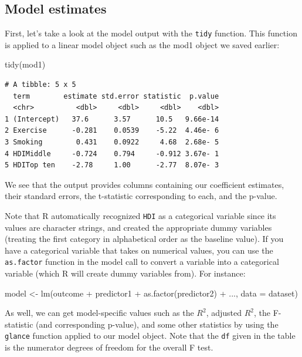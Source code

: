\documentclass[
  letterpaper,
  DIV=11,
  numbers=noendperiod]{scrartcl}
\newenvironment{Shaded}{\begin{snugshade}}{\end{snugshade}}
\newcommand{\AttributeTok}[1]{\textcolor[rgb]{0.40,0.45,0.13}{#1}}
\newcommand{\FunctionTok}[1]{\textcolor[rgb]{0.28,0.35,0.67}{#1}}
\newcommand{\NormalTok}[1]{\textcolor[rgb]{0.00,0.23,0.31}{#1}}
\newcommand{\OtherTok}[1]{\textcolor[rgb]{0.00,0.23,0.31}{#1}}
\newcommand{\SpecialCharTok}[1]{\textcolor[rgb]{0.37,0.37,0.37}{#1}}
\begin{document}
\subsection{Model estimates}\label{model-estimates}

First, let's take a look at the model output with the \texttt{tidy}
function. This function is applied to a linear model object such as the
mod1 object we saved earlier:

\begin{Shaded}
\begin{Highlighting}[]
\FunctionTok{tidy}\NormalTok{(mod1)}
\end{Highlighting}
\end{Shaded}

\begin{verbatim}
# A tibble: 5 x 5
  term        estimate std.error statistic  p.value
  <chr>          <dbl>     <dbl>     <dbl>    <dbl>
1 (Intercept)   37.6      3.57      10.5   9.66e-14
2 Exercise      -0.281    0.0539    -5.22  4.46e- 6
3 Smoking        0.431    0.0922     4.68  2.68e- 5
4 HDIMiddle     -0.724    0.794     -0.912 3.67e- 1
5 HDITop ten    -2.78     1.00      -2.77  8.07e- 3
\end{verbatim}

We see that the output provides columns containing our coefficient
estimates, their standard errors, the t-statistic corresponding to each,
and the p-value.

Note that R automatically recognized \texttt{HDI} as a categorical
variable since its values are character strings, and created the
appropriate dummy variables (treating the first category in alphabetical
order as the baseline value). If you have a categorical variable that
takes on numerical values, you can use the \texttt{as.factor} function
in the model call to convert a variable into a categorical variable
(which R will create dummy variables from). For instance:

\begin{Shaded}
\begin{Highlighting}[]
\NormalTok{model }\OtherTok{\textless{}{-}} \FunctionTok{lm}\NormalTok{(outcome }\SpecialCharTok{+}\NormalTok{ predictor1 }\SpecialCharTok{+} \FunctionTok{as.factor}\NormalTok{(predictor2) }\SpecialCharTok{+}\NormalTok{ ..., }\AttributeTok{data =}\NormalTok{ dataset)}
\end{Highlighting}
\end{Shaded}

As well, we can get model-specific values such as the \(R^2\), adjusted
\(R^2\), the F-statistic (and corresponding p-value), and some other
statistics by using the \texttt{glance} function applied to our model
object. Note that the \texttt{df} given in the table is the numerator
degrees of freedom for the overall F test.
\end{document}
